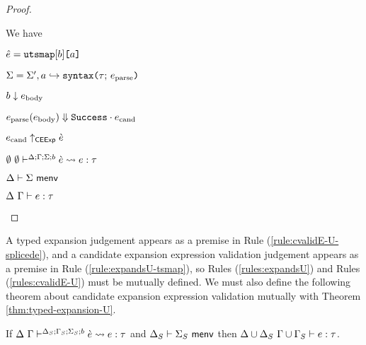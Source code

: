 \begin{proof}
\begin{byCases}
\item[\text{(\ref{rule:expandsU-tsmap})}] We have 
\begin{pfsteps*}
  \item $\hat{e}=\texttt{utsmap}[b]\texttt{[}a\texttt{]}$ 
  \item $\Sigma=\Sigma', a \hookrightarrow \texttt{syntax}\texttt{(}\tau;\,e_\text{parse}\texttt{)}$ 
  \item $b \downarrow e_\text{body}$ 
  \item $e_\text{parse}(e_\text{body}) \Downarrow \mathtt{Success} \cdot e_\text{cand}$ 
  \item $e_\text{cand} \uparrow_\mathsf{CEExp} \grave{e}$ 
  \item $\emptyset~\emptyset\vdash^{\Delta; \Gamma; \Sigma; b} \grave{e} \leadsto e : \tau$ 
  \item $\Delta \vdash \Sigma~\mathsf{menv}$  
  \item $\Delta~\Gamma \vdash e : \tau$ 
\end{pfsteps*}
\resetpfcounter
\end{byCases}
\end{proof}
A typed expansion judgement appears as a premise in Rule (\ref{rule:cvalidE-U-splicede}), and a candidate expansion expression validation judgement appears as a premise in Rule (\ref{rule:expandsU-tsmap}), so Rules (\ref{rules:expandsU}) and Rules (\ref{rules:cvalidE-U}) must be mutually defined. We must also define the following theorem about candidate expansion expression validation mutually with Theorem \ref{thm:typed-expansion-U}. 
\begin{theorem}\label{thm:candidate-expansion-validation-U}
If $\Delta~\Gamma\vdash^{\Delta_S; \Gamma_S; \Sigma_S; b} \grave{e} \leadsto e : \tau$ and $\Delta_S \vdash \Sigma_S~\mathsf{menv}$ then $\Delta \cup \Delta_S~\Gamma \cup \Gamma_S \vdash e : \tau$.
\end{theorem}
